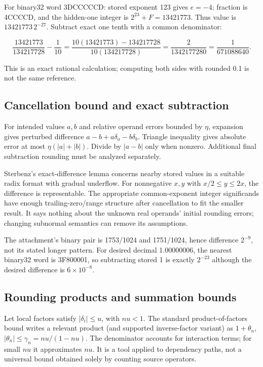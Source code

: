 For binary32 word 3DCCCCCD: stored exponent 123 gives \(e=-4\); fraction is 4CCCCD, and the hidden-one integer is \(2^{23}+F=13421773\). Thus value is \(13421773\,2^{-27}\). Subtract exact one tenth with a common denominator:

\[
\frac{13421773}{134217728}-\frac1{10}
=\frac{10(13421773)-134217728}{10(134217728)}
=\frac{2}{1342177280}=\frac1{671088640}.
\]

This is an exact rational calculation; computing both sides with rounded 0.1 is not the same reference.

\subsection{Cancellation bound and exact subtraction}\label{03-visual-computing-i-ch018-cancellation-bound-and-exact-subtraction}

For intended values \(a,b\) and relative operand errors bounded by \(\eta\), expansion gives perturbed difference \(a-b+a\delta_a-b\delta_b\). Triangle inequality gives absolute error at most \(\eta(|a|+|b|)\). Divide by \(|a-b|\) only when nonzero. Additional final subtraction rounding must be analyzed separately.

Sterbenz's exact-difference lemma concerns nearby stored values in a suitable radix format with gradual underflow. For nonnegative \(x,y\) with \(x/2\le y\le2x\), the difference is representable. The appropriate common-exponent integer significands have enough trailing-zero/range structure after cancellation to fit the smaller result. It says nothing about the unknown real operands' initial rounding errors; changing subnormal semantics can remove its assumptions.

The attachment's binary pair is 1753/1024 and 1751/1024, hence difference \(2^{-9}\), not its stated longer pattern. For desired decimal 1.00000006, the nearest binary32 word is 3F800001, so subtracting stored 1 is exactly \(2^{-23}\) although the desired difference is \(6\times10^{-8}\).

\subsection{Rounding products and summation bounds}\label{03-visual-computing-i-ch018-rounding-products-and-summation-bounds}

Let local factors satisfy \(|\delta_i|\le u\), with \(nu<1\). The standard product-of-factors bound writes a relevant product (and supported inverse-factor variant) as \(1+\theta_n\), \(|\theta_n|\le\gamma_n=nu/(1-nu)\). The denominator accounts for interaction terms; for small \(nu\) it approximates \(nu\). It is a tool applied to dependency paths, not a universal bound obtained solely by counting source operators.

